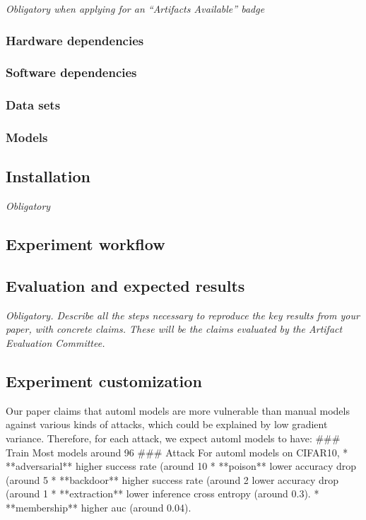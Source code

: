 \documentclass[letterpaper,twocolumn,10pt]{article}
\begin{document}
{{\em Obligatory when applying for an “Artifacts Available” badge}

\subsubsection{Hardware dependencies}

\subsubsection{Software dependencies}

\subsubsection{Data sets}

\subsubsection{Models}

\subsection{Installation}

{\em Obligatory}

\subsection{Experiment workflow}

\subsection{Evaluation and expected results}

{\em Obligatory. Describe all the steps necessary to reproduce the key results from your paper, with concrete claims. These will be the claims evaluated by the Artifact Evaluation Committee.}

\subsection{Experiment customization}
Our paper claims that automl models are more vulnerable than manual models against various kinds of attacks, which could be explained by low gradient variance. Therefore, for each attack, we expect automl models to have: 
### Train
Most models around 96%
### Attack
For automl models on CIFAR10,
* **adversarial**  
    higher success rate (around 10%
* **poison**  
    lower accuracy drop (around 5%
* **backdoor**  
    higher success rate (around 2%
    lower accuracy drop (around 1%
* **extraction**  
    lower inference cross entropy (around 0.3).
* **membership**  
    higher auc (around 0.04).

}
\end{document}
